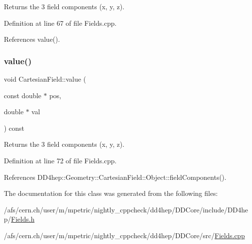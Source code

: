 Returns the 3 field components (x, y, z). 



Definition at line 67 of file Fields.\+cpp.



References value().

\hypertarget{class_d_d4hep_1_1_geometry_1_1_cartesian_field_a9cd91439c980a621f7f178e27bd63221}{}\label{class_d_d4hep_1_1_geometry_1_1_cartesian_field_a9cd91439c980a621f7f178e27bd63221} 
\subsubsection{\texorpdfstring{value()}{value()}\hspace{0.1cm}{\footnotesize\ttfamily [3/3]}}
{\footnotesize\ttfamily void Cartesian\+Field\+::value (\begin{DoxyParamCaption}\item[{const double $\ast$}]{pos,  }\item[{double $\ast$}]{val }\end{DoxyParamCaption}) const}



Returns the 3 field components (x, y, z). 



Definition at line 72 of file Fields.\+cpp.



References D\+D4hep\+::\+Geometry\+::\+Cartesian\+Field\+::\+Object\+::field\+Components().



The documentation for this class was generated from the following files\+:\begin{DoxyCompactItemize}
\item 
/afs/cern.\+ch/user/m/mpetric/nightly\+\_\+cppcheck/dd4hep/\+D\+D\+Core/include/\+D\+D4hep/\hyperlink{_fields_8h}{Fields.\+h}\item 
/afs/cern.\+ch/user/m/mpetric/nightly\+\_\+cppcheck/dd4hep/\+D\+D\+Core/src/\hyperlink{_fields_8cpp}{Fields.\+cpp}\end{DoxyCompactItemize}
